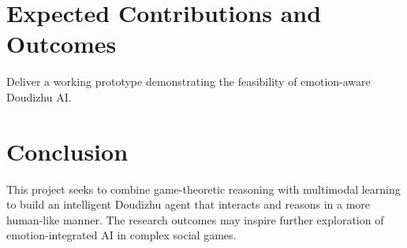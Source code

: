 \documentclass{article}
\begin{document}
\section{Expected Contributions and Outcomes}
Deliver a working prototype demonstrating the feasibility of emotion-aware Doudizhu AI.

\section{Conclusion}
This project seeks to combine game-theoretic reasoning with multimodal learning to build an intelligent Doudizhu agent that interacts and reasons in a more human-like manner. The research outcomes may inspire further exploration of emotion-integrated AI in complex social games.
\end{document}
